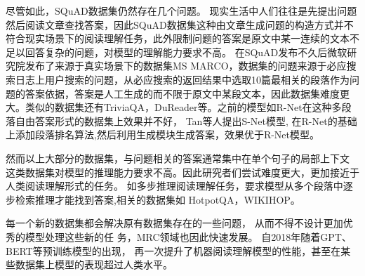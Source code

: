 尽管如此，SQuAD数据集仍然存在几个问题。
现实生活中人们往往是先提出问题然后阅读文章查找答案，因此SQuAD数据集这种由文章生成问题的构造方式并不符合现实场景下的阅读理解任务，此外限制问题的答案是原文中某一连续的文本不足以回答复杂的问题，对模型的理解能力要求不高。
在SQuAD发布不久后微软研究院发布了来源于真实场景下的数据集MS MARCO，数据集的问题来源于必应搜索日志上用户搜索的问题，从必应搜索的返回结果中选取10篇最相关的段落作为问题的答案依据，答案是人工生成的而不限于原文中某段文本，因此数据集难度更大。类似的数据集还有TriviaQA，DuReader等。之前的模型如R-Net在这种多段落自由答案形式的数据集上效果并不好，
Tan等人提出S-Net模型,
在R-Net的基础上添加段落排名算法,然后利用生成模块生成答案，效果优于R-Net模型。

然而以上大部分的数据集，与问题相关的答案通常集中在单个句子的局部上下文
这类数据集对模型的推理能力要求不高。因此研究者们尝试难度更大，更加接近于人类阅读理解形式的任务。
如多步推理阅读理解任务，要求模型从多个段落中逐步检索推理才能找到答案,相关的数据集如
HotpotQA，WIKIHOP。


每一个新的数据集都会解决原有数据集存在的一些问题，
从而不得不设计更加优秀的模型处理这些新的任
务，MRC领域也因此快速发展。
自2018年随着GPT、BERT等预训练模型的出现，
再一次提升了机器阅读理解模型的性能，甚至在某些数据集上模型的表现超过人类水平。

